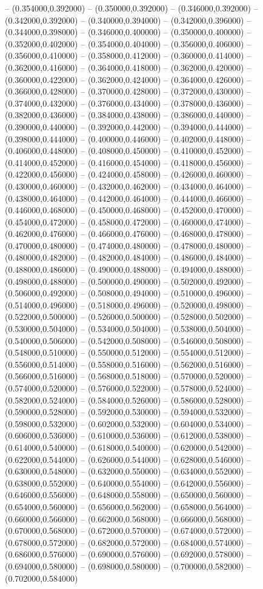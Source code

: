 -- (0.354000,0.392000) -- (0.350000,0.392000) -- (0.346000,0.392000) -- (0.342000,0.392000) -- (0.340000,0.394000) -- (0.342000,0.396000) -- (0.344000,0.398000) -- (0.346000,0.400000) -- (0.350000,0.400000) -- (0.352000,0.402000) -- (0.354000,0.404000) -- (0.356000,0.406000) -- (0.356000,0.410000) -- (0.358000,0.412000) -- (0.360000,0.414000) -- (0.362000,0.416000) -- (0.364000,0.418000) -- (0.362000,0.420000) -- (0.360000,0.422000) -- (0.362000,0.424000) -- (0.364000,0.426000) -- (0.366000,0.428000) -- (0.370000,0.428000) -- (0.372000,0.430000) -- (0.374000,0.432000) -- (0.376000,0.434000) -- (0.378000,0.436000) -- (0.382000,0.436000) -- (0.384000,0.438000) -- (0.386000,0.440000) -- (0.390000,0.440000) -- (0.392000,0.442000) -- (0.394000,0.444000) -- (0.398000,0.444000) -- (0.400000,0.446000) -- (0.402000,0.448000) -- (0.406000,0.448000) -- (0.408000,0.450000) -- (0.410000,0.452000) -- (0.414000,0.452000) -- (0.416000,0.454000) -- (0.418000,0.456000) -- (0.422000,0.456000) -- (0.424000,0.458000) -- (0.426000,0.460000) -- (0.430000,0.460000) -- (0.432000,0.462000) -- (0.434000,0.464000) -- (0.438000,0.464000) -- (0.442000,0.464000) -- (0.444000,0.466000) -- (0.446000,0.468000) -- (0.450000,0.468000) -- (0.452000,0.470000) -- (0.454000,0.472000) -- (0.458000,0.472000) -- (0.460000,0.474000) -- (0.462000,0.476000) -- (0.466000,0.476000) -- (0.468000,0.478000) -- (0.470000,0.480000) -- (0.474000,0.480000) -- (0.478000,0.480000) -- (0.480000,0.482000) -- (0.482000,0.484000) -- (0.486000,0.484000) -- (0.488000,0.486000) -- (0.490000,0.488000) -- (0.494000,0.488000) -- (0.498000,0.488000) -- (0.500000,0.490000) -- (0.502000,0.492000) -- (0.506000,0.492000) -- (0.508000,0.494000) -- (0.510000,0.496000) -- (0.514000,0.496000) -- (0.518000,0.496000) -- (0.520000,0.498000) -- (0.522000,0.500000) -- (0.526000,0.500000) -- (0.528000,0.502000) -- (0.530000,0.504000) -- (0.534000,0.504000) -- (0.538000,0.504000) -- (0.540000,0.506000) -- (0.542000,0.508000) -- (0.546000,0.508000) -- (0.548000,0.510000) -- (0.550000,0.512000) -- (0.554000,0.512000) -- (0.556000,0.514000) -- (0.558000,0.516000) -- (0.562000,0.516000) -- (0.566000,0.516000) -- (0.568000,0.518000) -- (0.570000,0.520000) -- (0.574000,0.520000) -- (0.576000,0.522000) -- (0.578000,0.524000) -- (0.582000,0.524000) -- (0.584000,0.526000) -- (0.586000,0.528000) -- (0.590000,0.528000) -- (0.592000,0.530000) -- (0.594000,0.532000) -- (0.598000,0.532000) -- (0.602000,0.532000) -- (0.604000,0.534000) -- (0.606000,0.536000) -- (0.610000,0.536000) -- (0.612000,0.538000) -- (0.614000,0.540000) -- (0.618000,0.540000) -- (0.620000,0.542000) -- (0.622000,0.544000) -- (0.626000,0.544000) -- (0.628000,0.546000) -- (0.630000,0.548000) -- (0.632000,0.550000) -- (0.634000,0.552000) -- (0.638000,0.552000) -- (0.640000,0.554000) -- (0.642000,0.556000) -- (0.646000,0.556000) -- (0.648000,0.558000) -- (0.650000,0.560000) -- (0.654000,0.560000) -- (0.656000,0.562000) -- (0.658000,0.564000) -- (0.660000,0.566000) -- (0.662000,0.568000) -- (0.666000,0.568000) -- (0.670000,0.568000) -- (0.672000,0.570000) -- (0.674000,0.572000) -- (0.678000,0.572000) -- (0.682000,0.572000) -- (0.684000,0.574000) -- (0.686000,0.576000) -- (0.690000,0.576000) -- (0.692000,0.578000) -- (0.694000,0.580000) -- (0.698000,0.580000) -- (0.700000,0.582000) -- (0.702000,0.584000) 